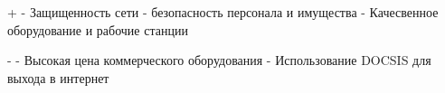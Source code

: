 \label{sec:outro}

+ - Защищенность сети 
  - безопасность персонала и имущества
  - Качесвенное оборудование и рабочие станции

- - Высокая цена коммерческого оборудования 
  - Использование DOCSIS для выхода в интернет
